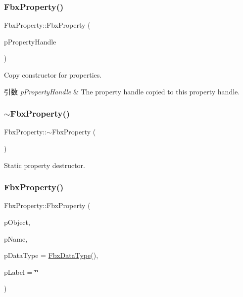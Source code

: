 \subsubsection{\texorpdfstring{Fbx\+Property()}{FbxProperty()}\hspace{0.1cm}{\footnotesize\ttfamily [3/5]}}
{\footnotesize\ttfamily Fbx\+Property\+::\+Fbx\+Property (\begin{DoxyParamCaption}\item[{const \hyperlink{class_fbx_property_handle}{Fbx\+Property\+Handle} \&}]{p\+Property\+Handle }\end{DoxyParamCaption})}

Copy constructor for properties. 
\begin{DoxyParams}{引数}
{\em p\+Property\+Handle} & The property handle copied to this property handle. \\
\hline
\end{DoxyParams}
\mbox{\label{class_fbx_property_aabd3a3fc65f04824f033844223735139}} 
\subsubsection{\texorpdfstring{$\sim$\+Fbx\+Property()}{~FbxProperty()}}
{\footnotesize\ttfamily Fbx\+Property\+::$\sim$\+Fbx\+Property (\begin{DoxyParamCaption}{ }\end{DoxyParamCaption})}

Static property destructor. \mbox{\label{class_fbx_property_aa9bd3c13031aeb1035adfb3e37256ce4}} 
\subsubsection{\texorpdfstring{Fbx\+Property()}{FbxProperty()}\hspace{0.1cm}{\footnotesize\ttfamily [4/5]}}
{\footnotesize\ttfamily Fbx\+Property\+::\+Fbx\+Property (\begin{DoxyParamCaption}\item[{\hyperlink{class_fbx_object}{Fbx\+Object} $\ast$}]{p\+Object,  }\item[{const char $\ast$}]{p\+Name,  }\item[{const \hyperlink{class_fbx_data_type}{Fbx\+Data\+Type} \&}]{p\+Data\+Type = {\ttfamily \hyperlink{class_fbx_data_type}{Fbx\+Data\+Type}()},  }\item[{const char $\ast$}]{p\+Label = {\ttfamily \char`\"{}\char`\"{}} }\end{DoxyParamCaption})\hspace{0.3cm}{\ttfamily [protected]}}

